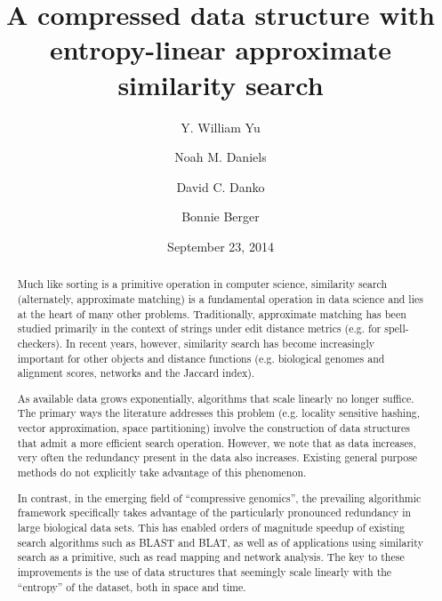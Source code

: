 \documentclass[review,preprint,12pt]{elsarticle}
\theoremstyle{definition}
\theoremstyle{remark}
\numberwithin{equation}{section}
\begin{document}
\begin{frontmatter}

\title{A compressed data structure with entropy-linear approximate similarity search}

\author[mitmath,mitcsail]{Y. William Yu}
\author[mitmath,mitcsail]{Noah M. Daniels}
\author[mitcsail]{David C. Danko}
\author[mitmath,mitcsail]{Bonnie Berger}
\address[mitmath]{Department of Mathematics, Massachusetts Institute of Technology, Cambridge, Massachusetts 02139}
\address[mitcsail]{Computer Science and AI Lab, Massachusetts Institute of Technology, Cambridge, Massachusetts 02139}



\date{September 23, 2014}



\begin{abstract}
Much like sorting is a primitive operation in computer science, similarity
search (alternately, approximate matching) is a fundamental operation in data
science and lies at the heart of many other problems.
Traditionally, approximate matching has been studied primarily in the context
of strings under edit distance metrics (e.g. for spell-checkers).
In recent years, however, similarity search has become increasingly important
for other objects and distance functions (e.g. biological genomes and alignment
scores, networks and the Jaccard index).

As available data grows exponentially, algorithms that scale linearly no longer
suffice.
The primary ways the literature addresses this problem (e.g. locality sensitive
hashing, vector approximation, space partitioning) involve the construction of
data structures that admit a more efficient search operation.
However, we note that as data increases, very often the redundancy present in
the data also increases.
Existing general purpose methods do not explicitly take advantage of this
phenomenon.


In contrast, in the emerging field of ``compressive genomics'', the prevailing
algorithmic framework specifically takes advantage of the particularly
pronounced redundancy in large biological data sets.
This has enabled orders of magnitude speedup of existing search algorithms such
as BLAST and BLAT, as well as of applications using similarity search as a
primitive, such as read mapping and network analysis.
The key to these improvements is the use of data structures that seemingly
scale linearly with the ``entropy'' of the dataset, both in space and time.


\end{abstract}
\end{frontmatter}
\end{document}
